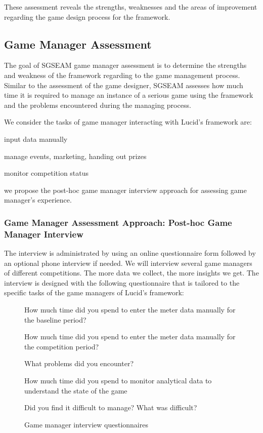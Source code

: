 \documentclass[11pt,oneside]{book}
\begin{document}
These assessment reveals the strengths, weaknesses and the areas of improvement regarding the game design process for the framework.

\subsection{Game Manager Assessment}

The goal of SGSEAM game manager assessment is to determine the strengths and weakness of the framework 
regarding to the game management process. Similar to the assessment of the game designer, SGSEAM assesses 
how much time it is required to manage an instance of a serious game using the framework
and the problems encountered during the managing process.

We consider the tasks of game manager interacting with Lucid's framework are:
\begin{compactenum}
    \item input data manually
    \item manage events, marketing, handing out prizes
    \item monitor competition status
\end{compactenum}

we propose the post-hoc game manager interview approach for assessing game manager's experience.
    
\subsubsection{Game Manager Assessment Approach: Post-hoc Game Manager Interview}
\label{Post-hoc game manager interview}

 The interview is administrated by using an online questionnaire form followed by an optional phone interview if needed. We will interview several game managers of different competitions. The more data we collect, the more insights we get.  The interview is designed with the following questionnaire that is tailored to the specific tasks of the game managers of Lucid's framework:

\begin{figure}[ht!]
\begin{mybox}
\begin{compactenum}
\item How much time did you spend to enter the meter data manually for the baseline period?
\item How much time did you spend to enter the meter data manually for the competition period?    
\item What problems did you encounter?
\item How much time did you spend to monitor analytical data to understand the state of the game
\item Did you find it difficult to manage? What was difficult?
\end{compactenum}
\end{mybox}
\caption{Game manager interview questionnaires}
\label{fig:game-manager-interview}  
\end{figure}
\end{document}
